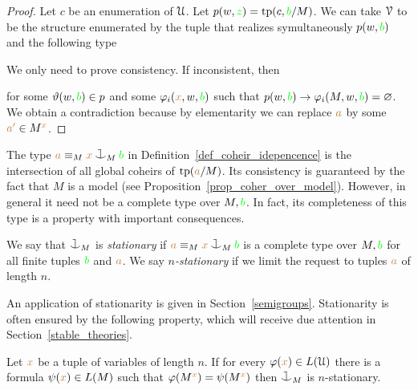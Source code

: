 \begin{proof}
  Let $c$ be an enumeration of $\EuScript U$.
  Let $p(w,{\color{green} z})={\rm tp}(c,{\color{green} b}/M)$.
  We can take $\EuScript V$ to be the structure enumerated by the tuple that realizes symultaneously $p(w,{\color{green} b}) $ and the following type 


  We only need to prove consistency.
  If inconsistent, then 

  
for some $\vartheta(w,{\color{green} b})\in p$ and some $\varphi_i({\color{brown} x},w,{\color{green} b})$ such that $p(w,{\color{green} b})\rightarrow\varphi_i(M,w,{\color{green} b})=\varnothing$.
We obtain a contradiction because by elementarity we can replace ${\color{brown} a}$ by some ${\color{brown} a'}\in M^{\color{brown} x}$.
\end{proof}


The type ${\mr a}\equiv_M{\mr x}\cnonfork_M{\gr b}$ in Definition~\ref{def_coheir_idepencence} is the intersection of all global coheirs of ${\rm tp}({\color{brown} a}/M)$.
%
Its consistency is guaranteed by the fact that $M$ is a model (see Proposition~\ref{prop_coher_over_model}).
%
However, in general it need not be a complete type over $M,{\color{green} b}$.
%
In fact, its completeness of this type is a property with important consequences.

\begin{definition}\label{def_coheir_stationary} We say that $\cnonfork_M$ is \emph{stationary\/} if ${\mr a}\equiv_M{\mr x}\cnonfork_M{\gr b}$ is a complete type over $M,{\color{green} b}$ for all finite tuples ${\color{green} b}$ and ${\color{brown} a}$.
We say \emph{$n$-stationary\/} if we limit the request to tuples ${\color{brown} a}$ of length $n$.
\end{definition}

An application of stationarity is given in Section~\ref{semigroups}.
Stationarity is often ensured by the following property, which will receive due attention in Section~\ref{stable_theories}.

\begin{proposition}
Let ${\color{brown} x}$ be a tuple of variables of length $n$.
If for every $\varphi({\color{brown} x})\in L(\EuScript U)$ there is a formula $\psi({\color{brown} x})\in L(M)$ such that $\varphi(M^{\color{brown} x})=\psi(M^{\color{brown} x})$ then $\cnonfork_M$ is $n$-stationary.
\end{proposition}

